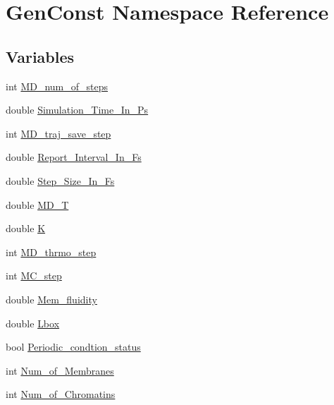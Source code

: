 \hypertarget{namespaceGenConst}{}\section{Gen\+Const Namespace Reference}
\label{namespaceGenConst}
\subsection*{Variables}
\begin{DoxyCompactItemize}
\item 
int \mbox{\hyperlink{namespaceGenConst_a58312afaa32dc266f031e5fb7752ba78}{M\+D\+\_\+num\+\_\+of\+\_\+steps}}
\item 
double \mbox{\hyperlink{namespaceGenConst_a42400cc3781a5ee575ddafe4dcc2403f}{Simulation\+\_\+\+Time\+\_\+\+In\+\_\+\+Ps}}
\item 
int \mbox{\hyperlink{namespaceGenConst_aaa51b4cdf7be8e16996b1899f08a19bc}{M\+D\+\_\+traj\+\_\+save\+\_\+step}}
\item 
double \mbox{\hyperlink{namespaceGenConst_accb4df9604e3e9efe42479d91e6bbb55}{Report\+\_\+\+Interval\+\_\+\+In\+\_\+\+Fs}}
\item 
double \mbox{\hyperlink{namespaceGenConst_a555432eb109df9dc1cf430bd6eccef30}{Step\+\_\+\+Size\+\_\+\+In\+\_\+\+Fs}}
\item 
double \mbox{\hyperlink{namespaceGenConst_ae4fd28941bbc23f551687bc507c5bde7}{M\+D\+\_\+T}}
\item 
double \mbox{\hyperlink{namespaceGenConst_a80679742796064a242391cd8e3c067d0}{K}}
\item 
int \mbox{\hyperlink{namespaceGenConst_a56bcad4f77ee68b9b821e6770faa0919}{M\+D\+\_\+thrmo\+\_\+step}}
\item 
int \mbox{\hyperlink{namespaceGenConst_aac99dcb054b423a41800b8cabed53f75}{M\+C\+\_\+step}}
\item 
double \mbox{\hyperlink{namespaceGenConst_a35fca1b123cae57a3f8f6de82e02f553}{Mem\+\_\+fluidity}}
\item 
double \mbox{\hyperlink{namespaceGenConst_a4d02aacef0ace9dedc9612fa17da3881}{Lbox}}
\item 
bool \mbox{\hyperlink{namespaceGenConst_a5c58935925954afa6c36447bc71802f5}{Periodic\+\_\+condtion\+\_\+status}}
\item 
int \mbox{\hyperlink{namespaceGenConst_aa4620ff0cfd797dc4c4a3e49a110978f}{Num\+\_\+of\+\_\+\+Membranes}}
\item 
int \mbox{\hyperlink{namespaceGenConst_a5834e6b32f10d9a8fdad757040eb51c0}{Num\+\_\+of\+\_\+\+Chromatins}}

\end{DoxyCompactItemize}
